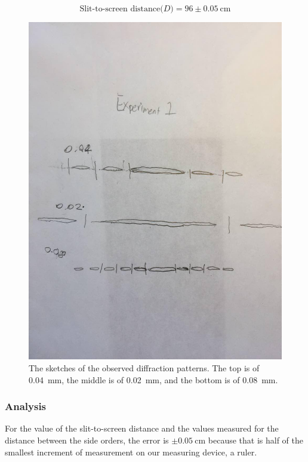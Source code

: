 \documentclass[12pt]{article}
\begin{document}
\[\text{Slit-to-screen distance(}D\text{)} = 96 \pm \SI{0.05}{\centi\meter}\]

\begin{figure}[H]
  \label{pic:exp1}
  \begin{center}
    \includegraphics[scale=0.4]{exp1.jpg}
  \end{center}
  \caption{The sketches of the observed diffraction patterns. The top is of
    \SI{0.04}{\milli\meter}, the middle is of \SI{0.02}{\milli\meter}, and the
    bottom is of \SI{0.08}{\milli\meter}.}
\end{figure}

\subsubsection{Analysis}

\qq For the value of the slit-to-screen distance and the values measured for the
distance between the side orders, the error is \(\pm \SI{0.05}{\centi\meter}\)
because that is half of the smallest increment of measurement on our measuring
device, a ruler.













\end{document}
